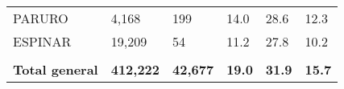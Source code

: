 \begin{tabular}{llllll}
	\cellcolor[HTML]{F8CBAD}PARURO                                 & 4,168                                                                 & 199                                                              & 14.0                                                                             & 28.6                                                                        & 12.3                                                                                \\
	\cellcolor[HTML]{F8CBAD}ESPINAR                                & 19,209                                                                & 54                                                               & 11.2                                                                             & 27.8                                                                        & 10.2                                                                                \\
	&                                                                       &                                                                  &                                                                                  &                                                                             &                                                                                     \\
	\rowcolor[HTML]{DDEBF7} 
	\textbf{Total   general}                                       & \textbf{412,222}                                                      & \textbf{42,677}                                                  & \textbf{19.0}                                                                    & \textbf{31.9}                                                               & \textbf{15.7}                                                                      
\end{tabular}